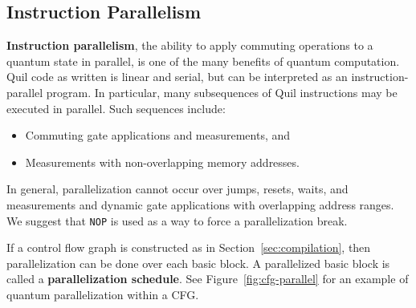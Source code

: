 \documentclass[conference]{IEEEtran}
\newcommand{\defn}[1]{\textbf{#1}}
\begin{document}
\subsection{Instruction Parallelism}\label{sec:parallel}
\defn{Instruction parallelism}, the ability to apply commuting operations to a quantum state in parallel, is one of the many benefits of quantum computation. Quil code as written is linear and serial, but can be interpreted as an instruction-parallel program. In particular, many subsequences of Quil instructions may be executed in parallel. Such sequences include:
\begin{itemize}
\item Commuting gate applications and measurements, and
\item Measurements with non-overlapping memory addresses.
\end{itemize}
In general, parallelization cannot occur over jumps, resets, waits, and measurements and dynamic gate applications with overlapping address ranges. We suggest that \verb|NOP| is used as a way to force a parallelization break.

If a control flow graph is constructed as in Section~\ref{sec:compilation}, then parallelization can be done over each basic block. A parallelized basic block is called a \defn{parallelization schedule}. See Figure~\ref{fig:cfg-parallel} for an example of quantum parallelization within a CFG.
\end{document}
